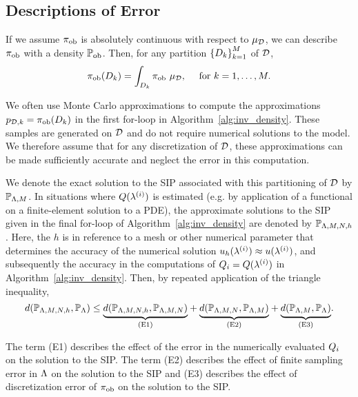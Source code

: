 \subsection{Descriptions of Error}\label{sec:set-error}
If we assume $\operatorname*{\pi_{ob}}$ is absolutely continuous with respect to $\mu_{\mathcal{D}}$, we can describe $\operatorname*{\pi_{ob}}$ with a density $\operatorname*{\mathbb{P}_{ob}}$. Then, for any partition $\left\{D_k\right\}_{k=1}^{M}$ of $\mathcal{D}$,
\[
\operatorname*{\pi_{ob}} (D_k) = \int_{D_k} \operatorname*{\pi_{ob}} \, \mu_{\mathcal{D}}, \quad \text{ for } k = 1, \hdots, M.
\]

We often use Monte Carlo approximations to compute the approximations $p_{\mathcal{D}, k}=\operatorname*{\pi_{ob}}(D_k)$ in the first for-loop in Algorithm~\ref{alg:inv_density}.
These samples are generated on $\mathcal{D}$ and do not require numerical solutions to the model.
We therefore assume that for any discretization of $\mathcal{D}$, these approximations can be made sufficiently accurate and neglect the error in this computation.

We denote the exact solution to the SIP associated with this partitioning of $\mathcal{D}$ by $\mathbb{P}_{{\Lambda}, M}$.
In situations where $Q(\lambda^{(i)})$ is estimated (e.g. by application of a functional on a finite-element solution to a PDE), the approximate solutions to the SIP given in the final for-loop of Algorithm~\ref{alg:inv_density} are denoted by $\mathbb{P}_{{\Lambda}, M, N, h}$.
Here, the $h$ is in reference to a mesh or other numerical parameter that determines the accuracy of the numerical solution $u_h(\lambda^{(i)})\approx u(\lambda^{(i)})$, and subsequently the accuracy in the computations of $Q_i = Q(\lambda^{(i)})$ in Algorithm~\ref{alg:inv_density}.
Then, by repeated application of the triangle inequality,
\begin{equation}
\label{eq:set-triangleineq}
d(\mathbb{P}_{{\Lambda}, M, N, h}, \mathbb{P}_{\Lambda}) \leq
\underset{ \text{(E1)} }{\underbrace{d(\mathbb{P}_{{\Lambda}, M, N, h},\mathbb{P}_{{\Lambda}, M, N})}} +
\underset{ \text{(E2)} }{\underbrace{d(\mathbb{P}_{{\Lambda}, M, N}, \mathbb{P}_{{\Lambda}, M}) }}+
\underset{ \text{(E3)} }{\underbrace{d(\mathbb{P}_{{\Lambda}, M}, \mathbb{P}_{\Lambda}) }}.
\end{equation}

The term (E1) describes the effect of the error in the numerically evaluated $Q_i$ on the solution to the SIP.
The term (E2) describes the effect of finite sampling error in ${\Lambda}$ on the solution to the SIP and (E3) describes the effect of discretization error of $\operatorname*{\pi_{ob}}$ on the solution to the SIP.


